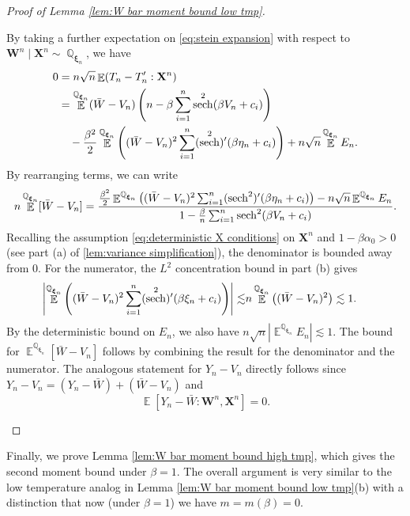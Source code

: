 \documentclass[preprint,reqno]{imsart}
\DeclareMathOperator{\sech}{sech}
\DeclareMathOperator{\EE}{\mathbb{E}}
\DeclareMathOperator{\QQ}{\mathbb{Q}}
\newcommand{\W}{\mathbf{W}}
\newcommand{\X}{\mathbf{X}}
\newcommand{\xxi}{\boldsymbol \xi}
\DeclareMathOperator{\sumin}{\sum_{\mathnormal i=1}^{\mathnormal n}}
\begin{document}
\begin{appendix}
\begin{proof}[Proof of Lemma \ref{lem:W bar moment bound low tmp}]
\begin{enumerate}[(a)]
    By taking a further expectation on \eqref{eq:stein expansion} with respect to $\W^n \mid \X^n \sim {\QQ}_{\xxi_n}$, we have
    \begin{equation}\label{eq:stein expectation}
    \begin{aligned}
        0 &= n\sqrt{n} \EE(T_n - T_n' : \X^n) \\
        &= \EE^{\QQ_{\xxi_n}}(\bar{W}-V_n) \left(n -\beta \sumin \sech^2(\beta V_n + c_i) \right) \\
        &\quad - \frac{\beta^2}{2} \EE^{\QQ_{\xxi_n}} \left((\bar{W}-V_n)^2 \sumin (\sech^2)'(\beta \eta_n + c_i) \right) + n\sqrt{n} \EE^{\QQ_{\xxi_n}} E_n.
    \end{aligned}
    \end{equation}
    By rearranging terms, we can write
    $$n \EE^{\QQ_{\xxi_n}}[\bar{W}-V_n] = \frac{\frac{\beta^2}{2} \EE^{\QQ_{\xxi_n}} \left((\bar{W}-V_n)^2 \sumin (\sech^2)'(\beta \eta_n + c_i) \right) - n\sqrt{n} \EE^{\QQ_{\xxi_n}} E_n}{1 - \frac{\beta}{n} \sumin \sech^2(\beta V_n + c_i)}.$$
    Recalling the assumption \eqref{eq:deterministic X conditions} on $\X^n$ and $1-\beta \alpha_0>0$ (see part (a) of \cref{lem:variance simplification}), the denominator is bounded away from 0.
    For the numerator, the $L^2$ concentration bound in part (b) gives
    \begin{align*}
        \left|\EE^{\QQ_{\xxi_n}} \left((\bar{W}-V_n)^2 \sumin (\sech^2)'(\beta \xi_n + c_i) \right) \right| \lesssim &  n  \EE^{\QQ_{\xxi_n}} \left((\bar{W}-V_n)^2 \right) \lesssim 1.
    \end{align*}
    By the deterministic bound on $E_n$, we also have
    $n\sqrt{n} |\EE^{\QQ_{\xxi_n}} E_n| \lesssim 1.$
    The bound for $\EE^{\QQ_{\xxi_n}}[\bar{W}-V_n]$ follows by combining the result for the denominator and the numerator.
    The analogous statement for $Y_n - V_n$ directly follows since $Y_n - V_n = (Y_n - \bar{W}) + (\bar{W}-V_n)$ and $$\EE [Y_n - \bar{W} : \W^n, \X^n] = 0.$$
\end{enumerate}
    

    
\end{proof}

Finally, we prove Lemma \ref{lem:W bar moment bound high tmp}, which gives the second moment bound under $\beta=1$. The overall argument is very similar to the low temperature analog in Lemma \ref{lem:W bar moment bound low tmp}(b) with a distinction that now (under $\beta =1$) we have $m=m(\beta)=0$.


\end{appendix}
\end{document}
